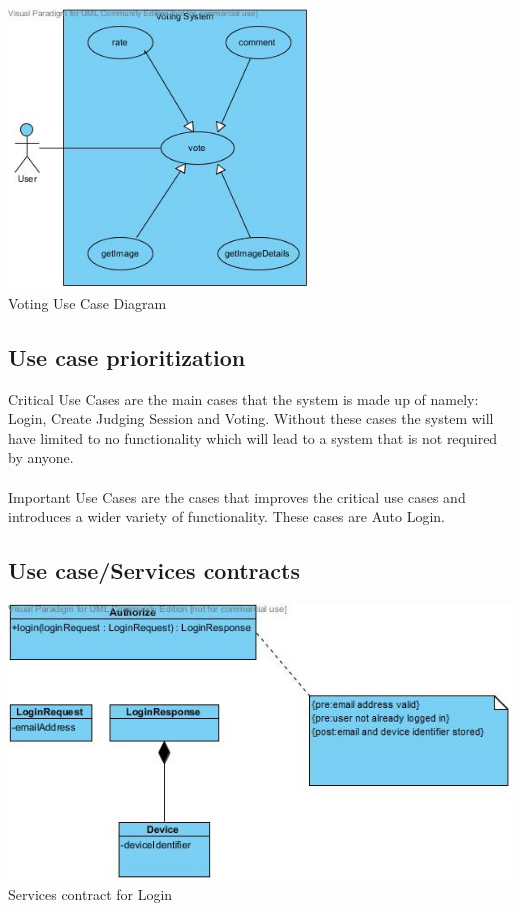 \documentclass[10pt,a4paper]{article}
\begin{document}
\begin{center}
\advance{}
\includegraphics[width=80mm]{Pictures/Vote.jpg} \\
Voting Use Case Diagram 
\end{center}

\subsection{Use case prioritization}
Critical Use Cases are the main cases that the system is made up of namely: Login, Create Judging Session and Voting. Without these cases the system will have limited to no functionality which will lead to a system that is not required by anyone.
\\ \\
Important Use Cases are the cases that improves the critical use cases and introduces a wider variety of functionality. These cases are Auto Login.


\subsection{Use case/Services contracts}
\begin{center}
\advance\leftskip-1.3cm
\includegraphics[width=160mm]{Pictures/servicesContractLogin.jpg} 
Services contract for Login
\end{center}
\end{document}
